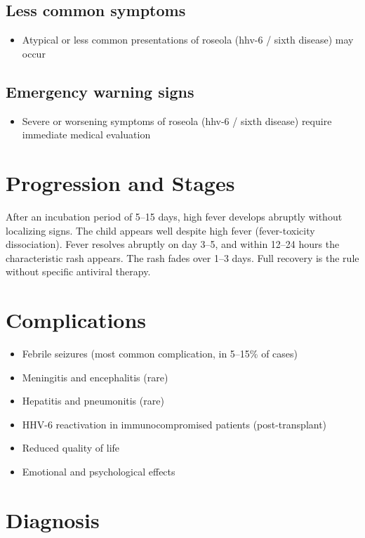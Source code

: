 \subsection{Less common symptoms}
\begin{itemize}[noitemsep]
  \item Atypical or less common presentations of roseola (hhv-6 / sixth disease) may occur
\end{itemize}

\subsection{Emergency warning signs}
\begin{itemize}[noitemsep]
  \item Severe or worsening symptoms of roseola (hhv-6 / sixth disease) require immediate medical evaluation
\end{itemize}
\section{Progression and Stages}
After an incubation period of 5--15 days, high fever develops abruptly without localizing signs. The child appears well despite high fever (fever-toxicity dissociation). Fever resolves abruptly on day 3--5, and within 12--24 hours the characteristic rash appears. The rash fades over 1--3 days. Full recovery is the rule without specific antiviral therapy.

\section{Complications}

\begin{itemize}[noitemsep]
  \item Febrile seizures (most common complication, in 5--15\% of cases)
  \item Meningitis and encephalitis (rare)
  \item Hepatitis and pneumonitis (rare)
  \item HHV-6 reactivation in immunocompromised patients (post-transplant)
  \item Reduced quality of life
  \item Emotional and psychological effects
\end{itemize}

\section{Diagnosis}


